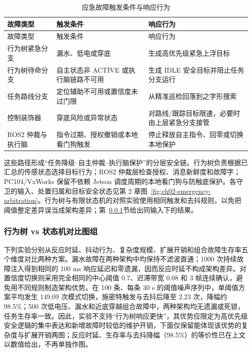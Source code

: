 \begin{longtable}[]{@{}
  >{\raggedright\arraybackslash}p{}
  >{\raggedright\arraybackslash}p{}
  >{\raggedright\arraybackslash}p{}@{}}
\caption{应急故障触发条件与响应行为}\label{tab:ch04-emergency-priority}\tabularnewline
\toprule\noalign{}
故障类型 & 触发条件 & 响应行为 \\
\midrule\noalign{}
\endfirsthead
\toprule\noalign{}
故障类型 & 触发条件 & 响应行为 \\
\midrule\noalign{}
\endhead
\bottomrule\noalign{}
\endlastfoot
行为树紧急分支 & 漏水、低电或穿底 & 生成高优先级紧急上浮目标 \\
行为树待命分支 & 自主状态非 ACTIVE 或执行脑链路不可用 & 生成 IDLE 安全目标并阻止任务分支运行 \\
任务路线分支 & 定位辅助不可用或置信度未过门限 & 从精准巡检回落到之字形搜索 \\
控制装饰器 & 穿底风险或异常状态 & 对路线/跟踪目标限速，必要时由上层紧急分支接管 \\
ROS2 仲裁与执行脑 & 指令过期、授权撤销或本地看门狗触发 & 停止释放自主指令、回零或切换本地保护 \\
\end{longtable}

这些路径形成``任务降级--自主仲裁--执行脑保护''的分层安全链。行为树负责根据已汇总的传感状态选择目标行为；ROS2 仲裁层检查授权、消息新鲜度和故障字；PC104/VxWorks 保留不依赖 Jetson 调度周期的本地看门狗与防触底保护。各守卫的输入、处置归属和目标安全状态见第 2 章图~\ref{fig:ch02-emergency-arbitration}。行为树与有限状态机的对照实验使用相同触发和去抖规则，以免把阈值整定差异误当成架构差异；第~\ref{sec:ch04-bt-fsm-figures}节给出同输入下的结果。

\subsubsection{行为树 vs 状态机对比图组}\label{sec:ch04-bt-fsm-figures}

下列实验分别从反应时延、抖动行为、复杂度规模、扩展开销和组合故障生存率五个维度对比两种方案。漏水故障在两种架构中均保持不滤波直通；1000 次持续故障注入得到相同的 100 ms 响应延迟和零遗漏，因而反应时延不构成架构差异。对置信度切换则采用完全相同的中心阈值 0.7、迟滞带宽 0.08 和 3 帧连续确认，避免用不同规则制造架构优势。在 100 条、每条 30 s 的阈值噪声序列中，单阈值方案平均发生 149.09 次模式切换，施密特触发与去抖后降至 2.23 次，降幅约 98.5\%；500 次低电压、漏水和近底穿越组合故障中，两种架构均无遗漏或死锁，任务生存率一致。因此，实验不支持``行为树响应更快''，其优势应限定为高优先级安全逻辑的集中表达和新增故障时较低的维护开销，下面仅保留能体现该优势的复杂度与扩展开销两图；反应时延、生存率与去抖降幅（98.5\%）的等价性已在上文以数值给出，不再单独作图。

